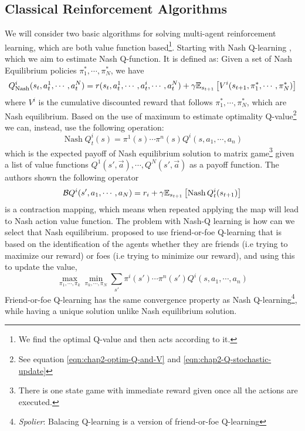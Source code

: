 \subsection{Classical Reinforcement Algorithms}
We will consider two basic algorithms for solving multi-agent reinforcement learning, which are both value function based\footnote{We find the optimal Q-value and then acts according to it.}. Starting with Nash Q-learning \cite{hu2003nash}, which we aim to estimate Nash Q-function. It is defined as: Given a set of Nash Equilibrium policies $\pi_1^*, \cdots, \pi_N^*$, we have 
\begin{equation}
    Q^i_{\operatorname{Nash}}(s_t, a^1_t, \cdots, a^N_t) = r(s_t, a^1_t, \cdots, a^i_t, \cdots, a^N_t) + \gamma\mathbb{E}_{s_{t+1}}\left[ V^i(s_{t+1}, \pi_1^*, \cdots, \pi_N^*) \right]
\end{equation}
where $V^i$ is the cumulative discounted reward that follows $\pi_1^*, \cdots, \pi_N^*$, which are Nash equilibrium. Based on the use of maximum to estimate optimality Q-value\footnote{See equation \ref{eqn:chap2-optim-Q-and-V} and \ref{eqn:chap2-Q-stochastic-update}} we can, instead, use the following operation:
\begin{equation}
    \operatorname{Nash} Q^i_t(s) = \pi^1(s)\cdots\pi^n(s)Q^i(s, a_1, \cdots, a_n)
\end{equation}
which is the expected payoff of Nash equilibrium solution to matrix game\footnote{There is one state game with immediate reward given once all the actions are executed.} given a list of value functions $Q^1(s', \vec{a}), \cdots, Q^N(s', \vec{a})$ as a payoff function. The authors shown the following operator 
\begin{equation}
    \mathcal{B} Q^i(s', a_1, \cdots, a_N) = r_i + \gamma \mathbb{E}_{s_{t+1}}\left[ \operatorname{Nash} Q^i_t(s_{t+1})  \right]
\end{equation}
is a contraction mapping, which means when repeated applying the map will lead to Nash action value function. The problem with Nash-Q learning is how can we select that Nash equilibrium. \cite{littman2001friend} proposed to use friend-or-foe Q-learning that is based on the identification of the agents whether they are friends (i.e trying to maximize our reward) or foes (i.e trying to minimize our reward), and using this to update the value,
\begin{equation}
    \max_{\pi_1, \cdots, \pi_k} \min_{\pi_k, \cdots, \pi_N}\sum_{s'} \pi^i(s')\cdots\pi^n(s')Q^i(s, a_1, \cdots, a_n)
\end{equation}
Friend-or-foe Q-learning has the same convergence property as Nash Q-learning\footnote{\textit{Spolier}: Balacing Q-learning is a  version of friend-or-foe Q-learning}, while having a unique solution unlike Nash equilibrium solution.